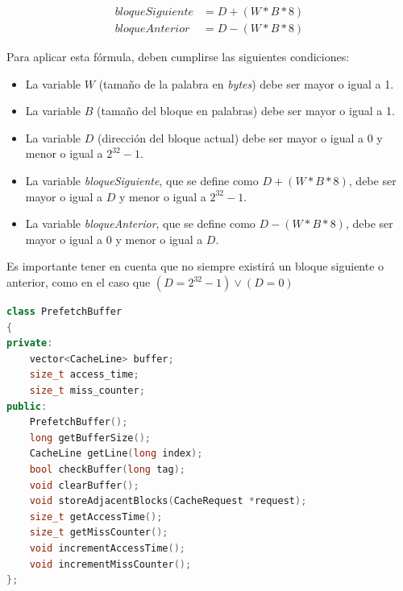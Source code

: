 \documentclass[12pt]{article}
\begin{document}
\begin{align*}
	\textit{bloqueSiguiente} &= D + (W * B * 8)\\
	\textit{bloqueAnterior} &= D - (W * B * 8)
\end{align*}

Para aplicar esta fórmula, deben cumplirse las siguientes condiciones:

\begin{itemize}
	\item La variable $W$ (tamaño de la palabra en \textit{bytes}) debe ser mayor o igual a 1.
	
	\item La variable $B$ (tamaño del bloque en palabras) debe ser mayor o igual a 1.
	
	\item La variable $D$ (dirección del bloque actual) debe ser mayor o igual a 0 y menor o igual a $2^{32}-1$.
	
	\item La variable \textit{bloqueSiguiente}, que se define como $D + (W * B * 8)$, debe ser mayor o igual a $D$ y menor o igual a $2^{32}-1$.
	
	\item La variable \textit{bloqueAnterior}, que se define como $D - (W * B * 8)$, debe ser mayor o igual a 0 y menor o igual a $D$.
\end{itemize}

Es importante tener en cuenta que no siempre existirá un bloque siguiente o anterior, como en el caso que $(D = 2^{32} - 1) \lor (D = 0)$
\vspace{5pt}
\begin{lstlisting}[language=C++, caption={Declaración de la Clase \lstinline|PrefetchBuffer|}]
class PrefetchBuffer
{
private:
	vector<CacheLine> buffer;
	size_t access_time;
	size_t miss_counter;
public:
	PrefetchBuffer();
	long getBufferSize();
	CacheLine getLine(long index);
	bool checkBuffer(long tag);
	void clearBuffer();
	void storeAdjacentBlocks(CacheRequest *request);
	size_t getAccessTime();
	size_t getMissCounter();
	void incrementAccessTime();
	void incrementMissCounter();
};
\end{lstlisting}
%
\end{document}
